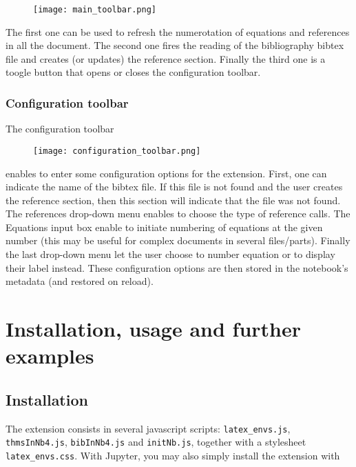 \begin{figure}[H]
\centerline{\texttt{[image: main\_toolbar.png]}}
\end{figure}

The first one can be used to refresh the numerotation of equations and
references in all the document. The second one fires the reading of the
bibliography bibtex file and creates (or updates) the reference section.
Finally the third one is a toogle button that opens or closes the
configuration toolbar.

    \subsubsection{Configuration toolbar}\label{configuration-toolbar}

    The configuration toolbar\\

\begin{figure}[H]
\centerline{\texttt{[image: configuration\_toolbar.png]}}
\end{figure}

enables to enter some configuration options for the extension. First,
one can indicate the name of the bibtex file. If this file is not found
and the user creates the reference section, then this section will
indicate that the file was not found. The references drop-down menu
enables to choose the type of reference calls. The Equations input box
enable to initiate numbering of equations at the given number (this may
be useful for complex documents in several files/parts). Finally the
last drop-down menu let the user choose to number equation or to display
their label instead. These configuration options are then stored in the
notebook's metadata (and restored on reload).

    \section{Installation, usage and further
examples}\label{installation-usage-and-further-examples}

    \subsection{Installation}\label{installation}

    The extension consists in several javascript scripts:
\texttt{latex\_envs.js}, \texttt{thmsInNb4.js}, \texttt{bibInNb4.js} and
\texttt{initNb.js}, together with a stylesheet \texttt{latex\_envs.css}.
With Jupyter, you may also simply install the extension with

